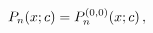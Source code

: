 \[\mathop{P_{n}\/}\nolimits\!\left(x;c\right)=\mathop{P^{(0,0)}_{n}\/}\nolimits%
\!\left(x;c\right),\]